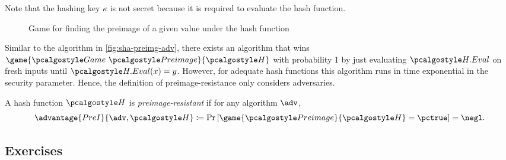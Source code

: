 Note that the hashing key $\kappa$ is not secret because it is required to evaluate the hash function.

\begin{figure}[tbhp]
  \begin{center}
    \begin{tcolorbox}[width=5cm]
      \begin{pchstack}[center]
      \end{pchstack}
    \end{tcolorbox}
  \end{center}
  \caption{Game for finding the preimage of a given value under the hash function \label{fig:break-hash}}
\end{figure}

Similar to the algorithm in \autoref{fig:sha-preimg-adv}, there exists an algorithm that wins $\game{\Game~\algo{Preimage}}{\algo{H}}$ with probability 1 by just evaluating $\algo{H.Eval}$ on fresh inputs until $\algo{H.Eval}(x) = y$.
However, for adequate hash functions this algorithm runs in time exponential in the security parameter.
Hence, the definition of preimage-resistance only considers \ppt adversaries.

\begin{definition}\label{def:preimage-resistance}
  A hash function $\algo{H}$ is \emph{preimage-resistant} if for any \ppt algorithm $\adv$,
 \[
  \advantage{PreI}{\adv, \algo{H}} \defeq \pr{\game{\algo{Preimage}}{\algo{H}} = \pctrue} = \negl.
 \]
\end{definition}



\subsection{Exercises}

